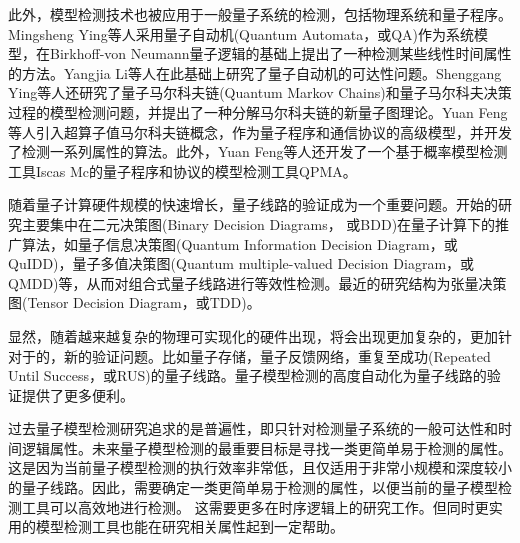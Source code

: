 此外，模型检测技术也被应用于一般量子系统的检测，包括物理系统和量子程序。Mingsheng Ying等人采用量子自动机(Quantum Automata，或QA)作为系统模型\citep{kondacs1997power}，在Birkhoff-von Neumann量子逻辑\citep{birkhoff1987logic}的基础上提出了一种检测某些线性时间属性的方法\citep{ying2014model}。Yangjia Li等人在此基础上研究了量子自动机的可达性问题\citep{li2014decidable}。Shenggang Ying等人还研究了量子马尔科夫链(Quantum Markov Chains)\citep{ying2013verification}和量子马尔科夫决策过程的模型检测问题，并提出了一种分解马尔科夫链的新量子图理论\citep{ying2013reachability,ying2018reachability}。Yuan Feng等人引入超算子值马尔科夫链概念，作为量子程序和通信协议的高级模型，并开发了检测一系列属性的算法\citep{feng2013model,feng2013reachability,feng2017model}。此外，Yuan Feng等人还开发了一个基于概率模型检测工具Iscas Mc\citep{hahn2014iscas}的量子程序和协议的模型检测工具QPMA\citep{feng2015qpmc}。

随着量子计算硬件规模的快速增长，量子线路的验证成为一个重要问题。开始的研究主要集中在二元决策图(Binary Decision Diagrams， 或BDD)在量子计算下的推广算法，如量子信息决策图(Quantum Information Decision Diagram，或QuIDD)\citep{Viamontes_2003}，量子多值决策图(Quantum multiple-valued Decision Diagram，或QMDD)\citep{Seiter_2013}等，从而对组合式量子线路进行等效性检测。最近的研究结构为张量决策图(Tensor Decision Diagram，或TDD)\citep{Hong_2022}。

显然，随着越来越复杂的物理可实现化的硬件出现，将会出现更加复杂的，更加针对于的，新的验证问题。比如量子存储\citep{Kerckhoff_2010}，量子反馈网络\citep{Gough_2008}，重复至成功(Repeated Until Success，或RUS)的量子线路\citep{Bocharov_2015}。量子模型检测的高度自动化为量子线路的验证提供了更多便利。

过去量子模型检测研究追求的是普遍性，即只针对检测量子系统的一般可达性和时间逻辑属性。未来量子模型检测的最重要目标是寻找一类更简单易于检测的属性。这是因为当前量子模型检测的执行效率非常低，且仅适用于非常小规模和深度较小的量子线路。因此，需要确定一类更简单易于检测的属性，以便当前的量子模型检测工具可以高效地进行检测\citep{ying2021model}。
这需要更多在时序逻辑上的研究工作。但同时更实用的模型检测工具也能在研究相关属性起到一定帮助。


